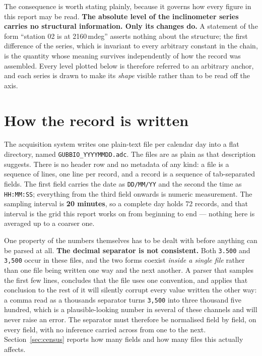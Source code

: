 \documentclass[11pt,a4paper]{article}
\begin{document}
The consequence is worth stating plainly, because it governs how every figure in this report may be read. \textbf{The absolute level of the inclinometer series carries no structural information. Only its changes do.} A statement of the form ``station 02 is at 2160\,mdeg'' asserts nothing about the structure; the first difference of the series, which is invariant to every arbitrary constant in the chain, is the quantity whose meaning survives independently of how the record was assembled. Every level plotted below is therefore referred to an arbitrary anchor, and each series is drawn to make its \emph{shape} visible rather than to be read off the axis.

\section{How the record is written}
\label{sec:format}

The acquisition system writes one plain-text file per calendar day into a flat directory, named \texttt{GUBBIO\_YYYYMMDD.adc}. The files are as plain as that description suggests. There is no header row and no metadata of any kind: a file is a sequence of lines, one line per record, and a record is a sequence of tab-separated fields. The first field carries the date as \texttt{DD/MM/YY} and the second the time as \texttt{HH:MM:SS}; everything from the third field onwards is numeric measurement. The sampling interval is \textbf{20 minutes}, so a complete day holds 72 records, and that interval is the grid this report works on from beginning to end --- nothing here is averaged up to a coarser one.

One property of the numbers themselves has to be dealt with before anything can be parsed at all. \textbf{The decimal separator is not consistent.} Both \texttt{3.500} and \texttt{3,500} occur in these files, and the two forms coexist \emph{inside a single file} rather than one file being written one way and the next another. A parser that samples the first few lines, concludes that the file uses one convention, and applies that conclusion to the rest of it will silently corrupt every value written the other way: a comma read as a thousands separator turns \texttt{3,500} into three thousand five hundred, which is a plausible-looking number in several of these channels and will never raise an error. The separator must therefore be normalised field by field, on every field, with no inference carried across from one to the next. Section~\ref{sec:census} reports how many fields and how many files this actually affects.
\end{document}

